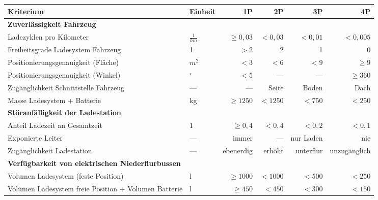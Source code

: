 \begin{table}
	\centering
	\begin{tabulary}{\linewidth}{LLrrrr}
		\toprule
		Kriterium                                                & Einheit          &         1P &      2P &        3P &           4P \\ \midrule
		\textbf{Zuverlässigkeit Fahrzeug}                        &                  &            &         &           &  \\
		Ladezyklen pro Kilometer                                 & $\frac{1}{km}$   & $\ge 0,03$ & $<0,03$ &   $<0,01$ &     $<0,005$ \\
		Freiheitsgrade Ladesystem Fahrzeug                       & 1                &       $>2$ &       2 &         1 &            0 \\
		Positionierungsgenauigkeit (Fläche)                      & $m^2$            &       $<3$ &    $<6$ &      $<9$ &      $\ge 9$ \\
		Positionierungsgenauigkeit (Winkel)                      & $^\circ$         &       $<5$ &     --- &       --- &    $\ge 360$ \\
		Zugänglichkeit Schnittstelle Fahrzeug                    & ---              &        --- &   Seite &     Boden &         Dach \\
		Masse Ladesystem + Batterie                              & kg               & $\ge 1250$ & $<1250$ &    $<750$ &       $<250$ \\ \midrule
		\textbf{Störanfälligkeit der Ladestation}                &                  &            &         &           &  \\
		Anteil Ladezeit an Gesamtzeit                            & 1                &  $\ge 0,4$ &  $<0,4$ &    $<0,2$ &       $<0,1$ \\
		Exponierte Leiter                                        & ---              &      immer &     --- & nur Laden &          nie \\
		Zugänglichkeit Ladestation                               & ---              &  ebenerdig &  erhöht & unterflur & unzugänglich \\ \midrule
		\textbf{Verfügbarkeit von elektrischen Niederflurbussen} &                  &            &         &           &  \\
		Volumen Ladesystem (feste Position)                      & l                & $\ge 1000$ & $<1000$ &    $<500$ &       $<250$ \\
		Volumen Ladesystem freie Position + Volumen Batterie     & l                &  $\ge 450$ &  $<450$ &    $<300$ &       $<150$ \\ \midrule

\end{tabulary}
\end{table}
